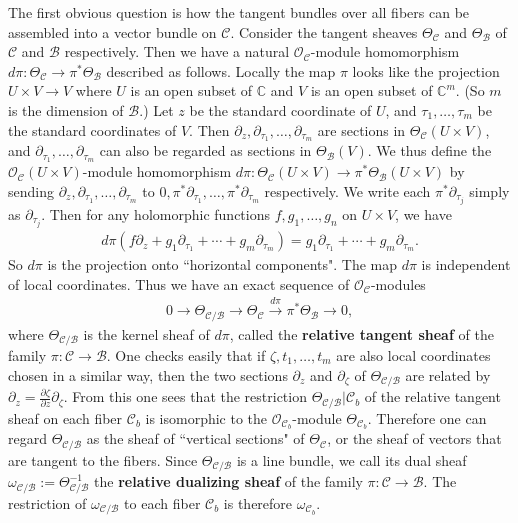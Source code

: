 \documentclass[12pt,b5paper,notitlepage]{report}
\theoremstyle{definition}
\theoremstyle{plain}
\newcommand{\mc}{\mathcal}
\newcommand{\scr}{\mathscr}
\numberwithin{equation}{section}
\begin{document}
The first obvious question is how  the tangent bundles over all fibers can be assembled into a vector bundle on $\mc C$. Consider the tangent sheaves $\Theta_{\mc C}$ and $\Theta_{\mc B}$ of $\mc C$ and $\mc B$ respectively. Then we have a natural $\scr O_{\mc C}$-module homomorphism $d\pi:\Theta_{\mc C}\rightarrow\pi^*\Theta_{\mc B}$ described as follows. Locally the map $\pi$ looks like the projection $U\times V\rightarrow V$ where $U$ is an open subset of $\mathbb C$ and $V$ is an open subset of $\mathbb C^m$. (So $m$ is the dimension of $\mc B$.)  Let $z$ be the standard coordinate of $U$, and $\tau_1,\dots,\tau_m$ be the standard coordinates of $V$. Then $\partial_z,\partial_{\tau_1},\dots,\partial_{\tau_m}$ are sections in $\Theta_{\mc C}(U\times V)$, and  $\partial_{\tau_1},\dots,\partial_{\tau_m}$ can also be regarded as sections in $\Theta_{\mc B}(V)$.  We thus define the $\scr O_{\mc C}(U\times V)$-module homomorphism $d\pi:\Theta_{\mc C}(U\times V)\rightarrow\pi^*\Theta_{\mc B}(U\times V)$ by sending $\partial_z,\partial_{\tau_1},\dots,\partial_{\tau_m}$ to  $0,\pi^*\partial_{\tau_1},\dots,\pi^*\partial_{\tau_m}$ respectively. We write each $\pi^*\partial_{\tau_j}$ simply as $\partial_{\tau_j}$. Then for any holomorphic functions $f,g_1,\dots,g_n$ on $U\times V$, we have
\begin{align}
d\pi(f\partial_z+g_1\partial_{\tau_1}+\cdots+g_m\partial_{\tau_m})=g_1\partial_{\tau_1}+\cdots+g_m\partial_{\tau_m}.
\end{align} 
So $d\pi$ is the projection onto  ``horizontal components". The map $d\pi$ is independent of local coordinates. Thus we have an exact sequence of $\scr O_{\mc C}$-modules
\begin{align}
0\rightarrow \Theta_{\mc C/\mc B}\rightarrow \Theta_{\mc C}\xrightarrow{d\pi}\pi^*\Theta_{\mc B}\rightarrow 0,\label{eq81}
\end{align}
where $\Theta_{\mc C/\mc B}$ is the kernel sheaf of $d\pi$, \index{zz@$\Theta_{\mc C/\mc B}$} called the \textbf{relative tangent sheaf} of the family $\pi:\mc C\rightarrow\mc B$. One checks easily that if $\zeta,t_1,\dots,t_m$ are also local  coordinates chosen in a similar way, then the two sections $\partial_z$ and $\partial_\zeta$ of $\Theta_{\mc C/\mc B}$ are related by $\partial_z=\frac{\partial\zeta}{\partial z}\partial_\zeta$. From this one sees that  the restriction $\Theta_{\mc C/\mc B}|\mc C_b$ of the relative tangent sheaf on each fiber $\mc C_b$ is isomorphic to the $\scr O_{\mc C_b}$-module $\Theta_{\mc C_b}$. Therefore one can regard $\Theta_{\mc C/\mc B}$ as the sheaf of ``vertical sections" of $\Theta_{\mc C}$, or the sheaf of vectors that are tangent to the fibers. Since $\Theta_{\mc C/\mc B}$ is a line bundle, we call its dual sheaf $\omega_{\mc C/\mc B}:=\Theta_{\mc C/\mc B}^{-1}$ \index{zz@$\omega_{\mc C/\mc B}$} the \textbf{relative dualizing sheaf} of the family $\pi:\mc C\rightarrow\mc B$. The restriction of $\omega_{\mc C/\mc B}$ to each fiber $\mc C_b$ is therefore $\omega_{\mc C_b}$.
\end{document}
